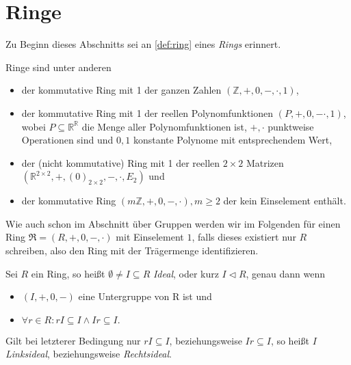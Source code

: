 

\section{Ringe}

Zu Beginn dieses Abschnitts sei an \cref{def:ring} eines \emph{Rings} erinnert.

\begin{example} Ringe sind unter anderen
    \begin{itemize}
        \item der kommutative Ring mit 1 der ganzen Zahlen $(\mathbb{Z}, +, 0, -, \cdot, 1)$,
        \item der kommutative Ring mit 1 der reellen Polynomfunktionen $(P, +, 0, - \cdot, 1)$, wobei $P \subseteq \mathbb{R}^\mathbb{R}$ die Menge aller Polynomfunktionen ist, $+, \cdot$ punktweise Operationen sind und $0, 1$ konstante Polynome mit entsprechendem Wert,
        \item der (nicht kommutative) Ring mit 1 der reellen $2 \times 2$ Matrizen $(\mathbb{R}^{2 \times 2}, +, (0)_{2 \times 2}, -, \cdot, E_2)$ und
        \item der kommutative Ring $(m\mathbb{Z}, +, 0, -, \cdot), m \geq 2$ der kein Einselement enthält.
    \end{itemize}
\end{example}

\begin{remark}
    Wie auch schon im Abschnitt über Gruppen werden wir im Folgenden für einen Ring $\mathfrak{R} = (R, +, 0, -, \cdot)$ mit Einselement $1$, falls dieses existiert nur $R$ schreiben, also den Ring mit der Trägermenge identifizieren.
\end{remark}

\begin{definition}
    Sei $R$ ein Ring, so heißt $\emptyset \neq I \subseteq R$ \emph{Ideal}, oder kurz $I \vartriangleleft R$, genau dann wenn
    \begin{itemize}
        \item $(I, +, 0, -)$ eine Untergruppe von R ist und
        \item $\forall r \in R: rI \subseteq I \land Ir \subseteq I.$
    \end{itemize}
    Gilt bei letzterer Bedingung nur $rI \subseteq I$, beziehungsweise $Ir \subseteq I$, so heißt $I$ \emph{Linksideal}, beziehungsweise \emph{Rechtsideal}.
\end{definition}

